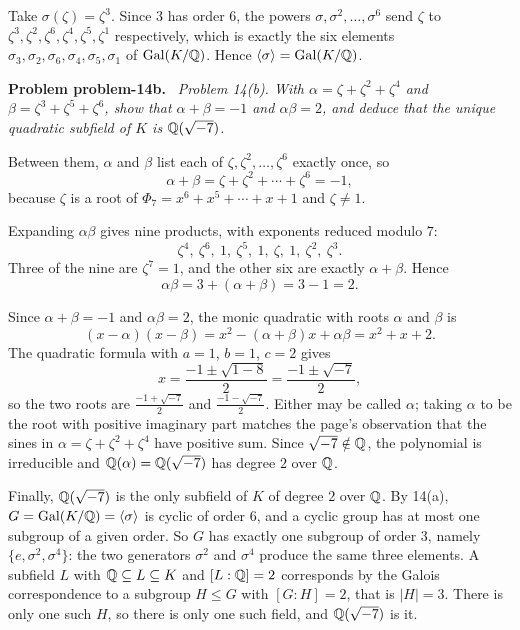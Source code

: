 \documentclass[11pt]{article}
\newenvironment{problem}[1]
  {\par\medskip\noindent\textbf{Problem #1.}\ \itshape}
  {\par\medskip}
\begin{document}
Take $\sigma(\zeta)=\zeta^{3}$. Since $3$ has order $6$, the powers $\sigma,\sigma^{2},\dots,\sigma^{6}$ send $\zeta$ to $\zeta^{3},\zeta^{2},\zeta^{6},\zeta^{4},\zeta^{5},\zeta^{1}$ respectively, which is exactly the six elements $\sigma_{3},\sigma_{2},\sigma_{6},\sigma_{4},\sigma_{5},\sigma_{1}$ of $\operatorname{Gal}(K/\mathbb{Q})$. Hence $\langle\sigma\rangle=\operatorname{Gal}(K/\mathbb{Q})$.

\begin{problem}{problem-14b}
Problem 14(b). With $\alpha=\zeta+\zeta^{2}+\zeta^{4}$ and $\beta=\zeta^{3}+\zeta^{5}+\zeta^{6}$, show that $\alpha+\beta=-1$ and $\alpha\beta=2$, and deduce that the unique quadratic subfield of $K$ is $\mathbb{Q}(\sqrt{-7})$.
\end{problem}
Between them, $\alpha$ and $\beta$ list each of $\zeta,\zeta^{2},\dots,\zeta^{6}$ exactly once, so
\[
\alpha+\beta=\zeta+\zeta^{2}+\cdots+\zeta^{6}=-1,
\]
because $\zeta$ is a root of $\Phi_7=x^{6}+x^{5}+\cdots+x+1$ and $\zeta\neq1$.

Expanding $\alpha\beta$ gives nine products, with exponents reduced modulo $7$:
\[
\zeta^{4},\ \zeta^{6},\ 1,\ \zeta^{5},\ 1,\ \zeta,\ 1,\ \zeta^{2},\ \zeta^{3}.
\]
Three of the nine are $\zeta^{7}=1$, and the other six are exactly $\alpha+\beta$. Hence
\[
\alpha\beta=3+(\alpha+\beta)=3-1=2.
\]

Since $\alpha+\beta=-1$ and $\alpha\beta=2$, the monic quadratic with roots $\alpha$ and $\beta$ is
\[
(x-\alpha)(x-\beta)=x^{2}-(\alpha+\beta)x+\alpha\beta=x^{2}+x+2.
\]
The quadratic formula with $a=1$, $b=1$, $c=2$ gives
\[
x=\frac{-1\pm\sqrt{1-8}}{2}=\frac{-1\pm\sqrt{-7}}{2},
\]
so the two roots are $\frac{-1+\sqrt{-7}}{2}$ and $\frac{-1-\sqrt{-7}}{2}$. Either may be called $\alpha$; taking $\alpha$ to be the root with positive imaginary part matches the page's observation that the sines in $\alpha=\zeta+\zeta^{2}+\zeta^{4}$ have positive sum. Since $\sqrt{-7}\notin\mathbb{Q}$, the polynomial is irreducible and $\mathbb{Q}(\alpha)=\mathbb{Q}(\sqrt{-7})$ has degree $2$ over $\mathbb{Q}$.

Finally, $\mathbb{Q}(\sqrt{-7})$ is the only subfield of $K$ of degree $2$ over $\mathbb{Q}$. By 14(a), $G=\operatorname{Gal}(K/\mathbb{Q})=\langle\sigma\rangle$ is cyclic of order $6$, and a cyclic group has at most one subgroup of a given order. So $G$ has exactly one subgroup of order $3$, namely $\{e,\sigma^{2},\sigma^{4}\}$: the two generators $\sigma^{2}$ and $\sigma^{4}$ produce the same three elements. A subfield $L$ with $\mathbb{Q}\subseteq L\subseteq K$ and $[L:\mathbb{Q}]=2$ corresponds by the Galois correspondence to a subgroup $H\le G$ with $[G:H]=2$, that is $|H|=3$. There is only one such $H$, so there is only one such field, and $\mathbb{Q}(\sqrt{-7})$ is it.
\end{document}
